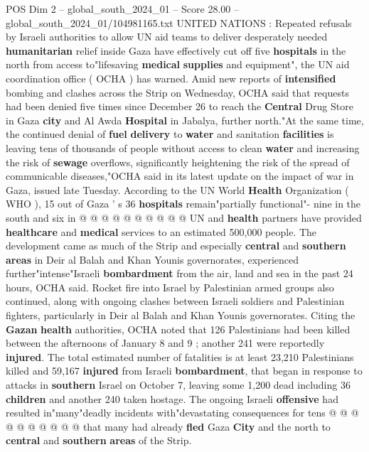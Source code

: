 \begin{textsample}{POS Dim 2 – global\_south\_2024\_01 – Score 28.00 – global\_south\_2024\_01/104981165.txt}  \label{ex:f2_pos_130}
UNITED NATIONS : Repeated refusals by Israeli authorities to allow UN aid teams to deliver desperately needed \textbf{humanitarian} relief inside Gaza have effectively cut off five \textbf{hospitals} in the north from access to"lifesaving \textbf{medical} \textbf{supplies} and equipment", the UN aid coordination office ( OCHA ) has warned.
Amid new reports of \textbf{intensified} bombing and clashes across the Strip on Wednesday, OCHA said that requests had been denied five times since December 26 to reach the \textbf{Central} Drug Store in Gaza \textbf{city} and Al Awda \textbf{Hospital} in Jabalya, further north."At the same time, the continued denial of \textbf{fuel} \textbf{delivery} to \textbf{water} and sanitation \textbf{facilities} is leaving tens of thousands of people without access to clean \textbf{water} and increasing the risk of \textbf{sewage} overflows, significantly heightening the risk of the spread of communicable diseases,"OCHA said in its latest update on the impact of war in Gaza, issued late Tuesday.
According to the UN World \textbf{Health} Organization ( WHO ), 15 out of Gaza ' s 36 \textbf{hospitals} remain"partially functional"- nine in the south and six in @ @ @ @ @ @ @ @ @ @ UN and \textbf{health} partners have provided \textbf{healthcare} and \textbf{medical} services to an estimated 500,000 people.
The development came as much of the Strip and especially \textbf{central} and \textbf{southern} \textbf{areas} in Deir al Balah and Khan Younis governorates, experienced further"intense"Israeli \textbf{bombardment} from the air, land and sea in the past 24 hours, OCHA said.
Rocket fire into Israel by Palestinian armed groups also continued, along with ongoing clashes between Israeli soldiers and Palestinian fighters, particularly in Deir al Balah and Khan Younis governorates.
Citing the \textbf{Gazan} \textbf{health} authorities, OCHA noted that 126 Palestinians had been killed between the afternoons of January 8 and 9 ; another 241 were reportedly \textbf{injured}.
The total estimated number of fatalities is at least 23,210 Palestinians killed and 59,167 \textbf{injured} from Israeli \textbf{bombardment}, that began in response to attacks in \textbf{southern} Israel on October 7, leaving some 1,200 dead including 36 \textbf{children} and another 240 taken hostage.
The ongoing Israeli \textbf{offensive} had resulted in"many"deadly incidents with"devastating consequences for tens @ @ @ @ @ @ @ @ @ @ that many had already \textbf{fled} Gaza \textbf{City} and the north to \textbf{central} and \textbf{southern} \textbf{areas} of the Strip.

\end{textsample}
